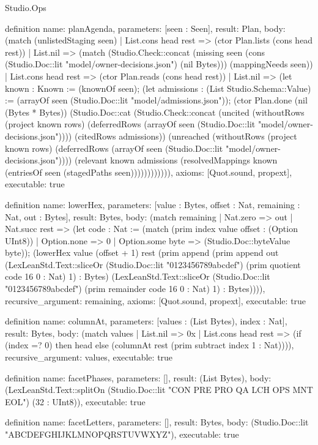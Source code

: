 \begin{lexlean}{Studio.Ops}
\begin{semanticmodule}
{definition{
  name: planAgenda,
  parameters: [seen : Seen],
  result: Plan,
  body: (match (unlistedStaging seen)
    | List.cons head rest => (ctor Plan.lists (cons head rest))
    | List.nil => (match (Studio.Check::concat (missing seen (cons (Studio.Doc::lit "model/owner-decisions.json") (nil Bytes))) (mappingNeeds seen))
      | List.cons head rest => (ctor Plan.reads (cons head rest))
      | List.nil => (let known : Known := (knownOf seen); (let admissions : (List Studio.Schema::Value) := (arrayOf seen (Studio.Doc::lit "model/admissions.json")); (ctor Plan.done (nil (Bytes * Bytes)) (Studio.Doc::cat (Studio.Check::concat (uncited (withoutRows (project known rows) (deferredRows (arrayOf seen (Studio.Doc::lit "model/owner-decisions.json")))) (citedRows admissions)) (unreached (withoutRows (project known rows) (deferredRows (arrayOf seen (Studio.Doc::lit "model/owner-decisions.json")))) (relevant known admissions (resolvedMappings known (entriesOf seen (stagedPaths seen)))))))))))),
  axioms: [Quot.sound, propext],
  executable: true
}

definition{
  name: lowerHex,
  parameters: [value : Bytes, offset : Nat, remaining : Nat, out : Bytes],
  result: Bytes,
  body: (match remaining
    | Nat.zero => out
    | Nat.succ rest => (let code : Nat := (match (prim index value offset : (Option UInt8))
      | Option.none => 0
      | Option.some byte => (Studio.Doc::byteValue byte)); (lowerHex value (offset + 1) rest (prim append (prim append out (LexLeanStd.Text::sliceOr (Studio.Doc::lit "0123456789abcdef") (prim quotient code 16 0 : Nat) 1) : Bytes) (LexLeanStd.Text::sliceOr (Studio.Doc::lit "0123456789abcdef") (prim remainder code 16 0 : Nat) 1) : Bytes)))),
  recursive_argument: remaining,
  axioms: [Quot.sound, propext],
  executable: true
}

definition{
  name: columnAt,
  parameters: [values : (List Bytes), index : Nat],
  result: Bytes,
  body: (match values
    | List.nil => 0x
    | List.cons head rest => (if (index =? 0) then head else (columnAt rest (prim subtract index 1 : Nat)))),
  recursive_argument: values,
  executable: true
}

definition{
  name: facetPhases,
  parameters: [],
  result: (List Bytes),
  body: (LexLeanStd.Text::splitOn (Studio.Doc::lit "CON PRE PRO QA LCH OPS MNT EOL") (32 : UInt8)),
  executable: true
}

definition{
  name: facetLetters,
  parameters: [],
  result: Bytes,
  body: (Studio.Doc::lit "ABCDEFGHIJKLMNOPQRSTUVWXYZ"),
  executable: true
}

}
\end{semanticmodule}
\end{lexlean}
